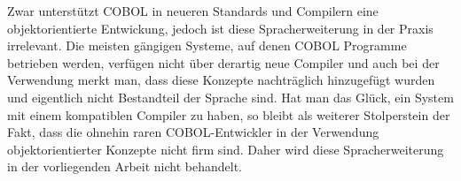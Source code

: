 Zwar unterstützt COBOL in neueren Standards und Compilern eine objektorientierte Entwickung, jedoch ist diese Spracherweiterung in der Praxis irrelevant. Die meisten gängigen Systeme, auf denen COBOL Programme betrieben werden, verfügen nicht über derartig neue Compiler und auch bei der Verwendung merkt man, dass diese Konzepte nachträglich hinzugefügt wurden und eigentlich nicht Bestandteil der Sprache sind. Hat man das Glück, ein System mit einem kompatiblen Compiler zu haben, so bleibt als weiterer Stolperstein der Fakt, dass die ohnehin raren COBOL-Entwickler in der Verwendung objektorientierter Konzepte nicht firm sind. Daher wird diese Spracherweiterung in der vorliegenden Arbeit nicht behandelt. 